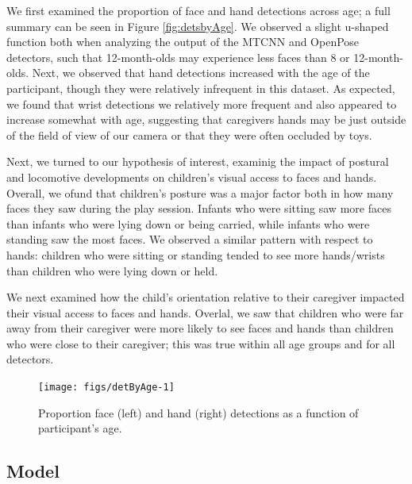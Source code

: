 \documentclass[10pt, letterpaper]{article}
\newenvironment{CodeChunk}{}{}
\begin{document}
We first examined the proportion of face and hand detections across age;
a full summary can be seen in Figure \ref{fig:detsbyAge}. We observed a
slight u-shaped function both when analyzing the output of the MTCNN and
OpenPose detectors, such that 12-month-olds may experience less faces
than 8 or 12-month-olds. Next, we observed that hand detections
increased with the age of the participant, though they were relatively
infrequent in this dataset. As expected, we found that wrist detections
we relatively more frequent and also appeared to increase somewhat with
age, suggesting that caregivers hands may be just outside of the field
of view of our camera or that they were often occluded by toys.

Next, we turned to our hypothesis of interest, examinig the impact of
postural and locomotive developments on children's visual access to
faces and hands. Overall, we ofund that children's posture was a major
factor both in how many faces they saw during the play session. Infants
who were sitting saw more faces than infants who were lying down or
being carried, while infants who were standing saw the most faces. We
observed a similar pattern with respect to hands: children who were
sitting or standing tended to see more hands/wrists than children who
were lying down or held.

We next examined how the child's orientation relative to their caregiver
impacted their visual access to faces and hands. Overlal, we saw that
children who were far away from their caregiver were more likely to see
faces and hands than children who were close to their caregiver; this
was true within all age groups and for all detectors.

\begin{CodeChunk}
\begin{figure}[h]

{\centering \texttt{[image: figs/detByAge-1]} 

}

\caption[Proportion face (left) and hand (right) detections as a function of participant's age]{Proportion face (left) and hand (right) detections as a function of participant's age.}\label{fig:detByAge}
\end{figure}
\end{CodeChunk}

\subsection{Model}\label{model}
\end{document}
